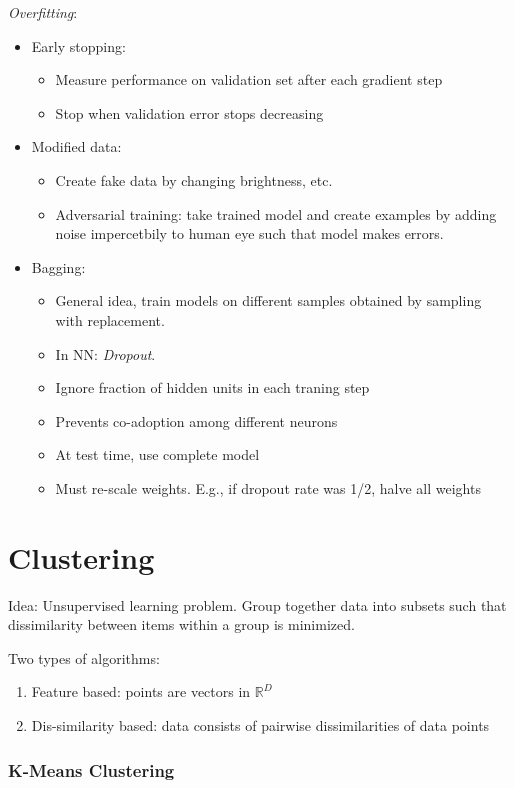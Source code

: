 \documentclass[11pt, %
	oneside, %
	english, %
	onehalfspacing, %
	parskip, %
	]{article} %
\theoremstyle{definition}
\begin{document}
\emph{Overfitting}:
\begin{itemize}
	\item Early stopping:
	\begin{itemize}
		\item Measure performance on validation set after each gradient step
		\item Stop when validation error stops decreasing
	\end{itemize}
	\item Modified data:
	\begin{itemize}
		\item Create fake data by changing brightness, etc.
		\item Adversarial training: take trained model and create examples by adding noise impercetbily to human eye such that model makes errors.
	\end{itemize}
	\item Bagging:
	\begin{itemize}
		\item General idea, train models on different samples obtained by sampling with replacement.
		\item In NN: \emph{Dropout}.
		\item Ignore fraction of hidden units in each traning step
		\item Prevents co-adoption among different neurons
		\item At test time, use complete model
		\item Must re-scale weights. E.g., if dropout rate was 1/2, halve all weights
	\end{itemize}
\end{itemize}

\section{Clustering}

Idea: Unsupervised learning problem. Group together data into subsets such that dissimilarity between items within a group is minimized.

Two types of algorithms:
\begin{enumerate}
	\item Feature based: points are vectors in $\mathbb{R}^D$
	\item Dis-similarity based: data consists of pairwise dissimilarities of data points
\end{enumerate}

\subsubsection*{K-Means Clustering}
\end{document}
